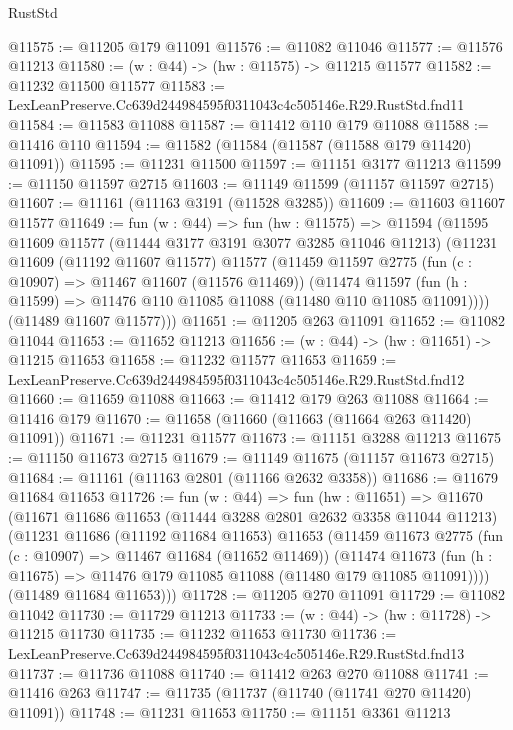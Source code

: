 \begin{lexlean}{RustStd}
\begin{coremodule}
@11575 := @11205 @179 @11091
@11576 := @11082 @11046
@11577 := @11576 @11213
@11580 := (w : @44) -> (hw : @11575) -> @11215 @11577
@11582 := @11232 @11500 @11577
@11583 := LexLeanPreserve.Cc639d244984595f0311043c4c505146e.R29.RustStd.fnd11
@11584 := @11583 @11088
@11587 := @11412 @110 @179 @11088
@11588 := @11416 @110
@11594 := @11582 (@11584 (@11587 (@11588 @179 @11420) @11091))
@11595 := @11231 @11500
@11597 := @11151 @3177 @11213
@11599 := @11150 @11597 @2715
@11603 := @11149 @11599 (@11157 @11597 @2715)
@11607 := @11161 (@11163 @3191 (@11528 @3285))
@11609 := @11603 @11607 @11577
@11649 := fun (w : @44) =>
  fun (hw : @11575) =>
  @11594
    (@11595
      @11609
      @11577
      (@11444 @3177 @3191 @3077 @3285 @11046 @11213)
      (@11231
        @11609
        (@11192 @11607 @11577)
        @11577
        (@11459
          @11597
          @2775
          (fun (c : @10907) => @11467 @11607 (@11576 @11469))
          (@11474
            @11597
            (fun (h : @11599) => @11476 @110 @11085 @11088 (@11480 @110 @11085 @11091))))
        (@11489 @11607 @11577)))
@11651 := @11205 @263 @11091
@11652 := @11082 @11044
@11653 := @11652 @11213
@11656 := (w : @44) -> (hw : @11651) -> @11215 @11653
@11658 := @11232 @11577 @11653
@11659 := LexLeanPreserve.Cc639d244984595f0311043c4c505146e.R29.RustStd.fnd12
@11660 := @11659 @11088
@11663 := @11412 @179 @263 @11088
@11664 := @11416 @179
@11670 := @11658 (@11660 (@11663 (@11664 @263 @11420) @11091))
@11671 := @11231 @11577
@11673 := @11151 @3288 @11213
@11675 := @11150 @11673 @2715
@11679 := @11149 @11675 (@11157 @11673 @2715)
@11684 := @11161 (@11163 @2801 (@11166 @2632 @3358))
@11686 := @11679 @11684 @11653
@11726 := fun (w : @44) =>
  fun (hw : @11651) =>
  @11670
    (@11671
      @11686
      @11653
      (@11444 @3288 @2801 @2632 @3358 @11044 @11213)
      (@11231
        @11686
        (@11192 @11684 @11653)
        @11653
        (@11459
          @11673
          @2775
          (fun (c : @10907) => @11467 @11684 (@11652 @11469))
          (@11474
            @11673
            (fun (h : @11675) => @11476 @179 @11085 @11088 (@11480 @179 @11085 @11091))))
        (@11489 @11684 @11653)))
@11728 := @11205 @270 @11091
@11729 := @11082 @11042
@11730 := @11729 @11213
@11733 := (w : @44) -> (hw : @11728) -> @11215 @11730
@11735 := @11232 @11653 @11730
@11736 := LexLeanPreserve.Cc639d244984595f0311043c4c505146e.R29.RustStd.fnd13
@11737 := @11736 @11088
@11740 := @11412 @263 @270 @11088
@11741 := @11416 @263
@11747 := @11735 (@11737 (@11740 (@11741 @270 @11420) @11091))
@11748 := @11231 @11653
@11750 := @11151 @3361 @11213

\end{coremodule}
\end{lexlean}
